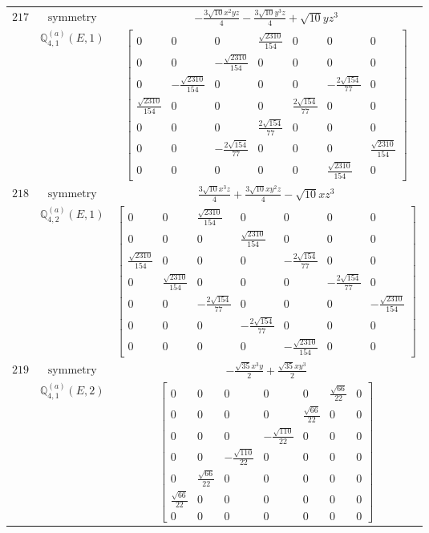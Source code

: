 \documentclass[fleqn,8pt,landscape]{jsarticle}
\begin{document}
\begin{longtable}{ccc}
$ 217 $ & $ \text{symmetry} $ & $ - \frac{3 \sqrt{10} x^{2} y z}{4} - \frac{3 \sqrt{10} y^{3} z}{4} + \sqrt{10} y z^{3} $ \\
$  $ & $ \mathbb{Q}_{4,1}^{(a)}(E,1) $ & $ \begin{bmatrix} 0 & 0 & 0 & \frac{\sqrt{2310}}{154} & 0 & 0 & 0 \\ 0 & 0 & - \frac{\sqrt{2310}}{154} & 0 & 0 & 0 & 0 \\ 0 & - \frac{\sqrt{2310}}{154} & 0 & 0 & 0 & - \frac{2 \sqrt{154}}{77} & 0 \\ \frac{\sqrt{2310}}{154} & 0 & 0 & 0 & \frac{2 \sqrt{154}}{77} & 0 & 0 \\ 0 & 0 & 0 & \frac{2 \sqrt{154}}{77} & 0 & 0 & 0 \\ 0 & 0 & - \frac{2 \sqrt{154}}{77} & 0 & 0 & 0 & \frac{\sqrt{2310}}{154} \\ 0 & 0 & 0 & 0 & 0 & \frac{\sqrt{2310}}{154} & 0 \end{bmatrix} $ \\ \hline
$ 218 $ & $ \text{symmetry} $ & $ \frac{3 \sqrt{10} x^{3} z}{4} + \frac{3 \sqrt{10} x y^{2} z}{4} - \sqrt{10} x z^{3} $ \\
$  $ & $ \mathbb{Q}_{4,2}^{(a)}(E,1) $ & $ \begin{bmatrix} 0 & 0 & \frac{\sqrt{2310}}{154} & 0 & 0 & 0 & 0 \\ 0 & 0 & 0 & \frac{\sqrt{2310}}{154} & 0 & 0 & 0 \\ \frac{\sqrt{2310}}{154} & 0 & 0 & 0 & - \frac{2 \sqrt{154}}{77} & 0 & 0 \\ 0 & \frac{\sqrt{2310}}{154} & 0 & 0 & 0 & - \frac{2 \sqrt{154}}{77} & 0 \\ 0 & 0 & - \frac{2 \sqrt{154}}{77} & 0 & 0 & 0 & - \frac{\sqrt{2310}}{154} \\ 0 & 0 & 0 & - \frac{2 \sqrt{154}}{77} & 0 & 0 & 0 \\ 0 & 0 & 0 & 0 & - \frac{\sqrt{2310}}{154} & 0 & 0 \end{bmatrix} $ \\ \hline
$ 219 $ & $ \text{symmetry} $ & $ - \frac{\sqrt{35} x^{3} y}{2} + \frac{\sqrt{35} x y^{3}}{2} $ \\
$  $ & $ \mathbb{Q}_{4,1}^{(a)}(E,2) $ & $ \begin{bmatrix} 0 & 0 & 0 & 0 & 0 & \frac{\sqrt{66}}{22} & 0 \\ 0 & 0 & 0 & 0 & \frac{\sqrt{66}}{22} & 0 & 0 \\ 0 & 0 & 0 & - \frac{\sqrt{110}}{22} & 0 & 0 & 0 \\ 0 & 0 & - \frac{\sqrt{110}}{22} & 0 & 0 & 0 & 0 \\ 0 & \frac{\sqrt{66}}{22} & 0 & 0 & 0 & 0 & 0 \\ \frac{\sqrt{66}}{22} & 0 & 0 & 0 & 0 & 0 & 0 \\ 0 & 0 & 0 & 0 & 0 & 0 & 0 \end{bmatrix} $ \\ \hline

\end{longtable}
\end{document}
